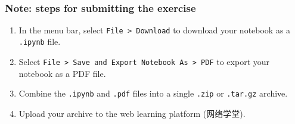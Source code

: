 \documentclass[11pt]{article}
\providecommand{\tightlist}{%
      \setlength{\itemsep}{0pt}\setlength{\parskip}{0pt}}
\begin{document}
    \begin{center}
    \end{center}
    { \hspace*{\fill} \\}
    
    \subsubsection{Note: steps for submitting the
exercise}\label{note-steps-for-submitting-the-exercise}

\begin{enumerate}
\def\labelenumi{\arabic{enumi}.}
\tightlist
\item
  In the menu bar, select \texttt{File\ \textgreater{}\ Download} to
  download your notebook as a \texttt{.ipynb} file.
\item
  Select
  \texttt{File\ \textgreater{}\ Save\ and\ Export\ Notebook\ As\ \textgreater{}\ PDF}
  to export your notebook as a PDF file.
\item
  Combine the \texttt{.ipynb} and \texttt{.pdf} files into a single
  \texttt{.zip} or \texttt{.tar.gz} archive.
\item
  Upload your archive to the web learning platform (网络学堂).
\end{enumerate}


    
    
    
\end{document}
